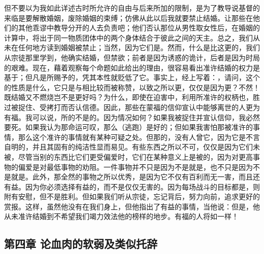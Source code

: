 但不要以为我如此详述古时所允许的自由与后来所加的限制，是为了教导说基督的来临是要解散婚姻，废除婚姻的束缚；仿佛从此以后我就要禁止结婚。让那些在他们的其他乖谬中教导分开的人去负责吧；他们否认那位从男性取女性后，在婚姻的计算中，将出于同一物质团体中的两个身体结合于彼此之间的天主。总之，我们从未在任何地方读到婚姻被禁止；当然，因为它们是。然而，什么是比这更的，我们从宗徒那里学到，他确实结婚，但禁欲；前者是因为诱惑的诡计，后者是因为时局的艰难。现在，藉着观察每个命题如此给出的理由，很容易看出准许结婚的权力是基于；但凡是所赐予的，凭其本性就贬低了它。事实上，经上写着：，请问，这个的性质是什么，它只是与相比较而被称赞，以致之所以更，仅仅是因为更？不然！既结婚又不燃烧岂不是更好吗？为什么，即使在迫害中，利用所准许的权柄也，胜过被捉住、受拷打而否认信德。因此，那些在蒙福的信仰宣认中能够离世的人更为有福。我可以说，所的不是的。因为情况如何？如果我被捉住并宣认信仰，我必然要死。如果我认为那命运可叹，那么（逃跑）是好的；但如果我害怕那被准许的事情，那么这个准许的事情就有某种可疑之处。但那的，没有人曾它，因为它是不言自明的，并且其固有的纯洁性显而易见。有些东西之所以不可，仅仅是因为它们未被，尽管当别的东西比它们更受偏爱时，它们在某种意义上是被的，因为对更高事物的偏爱是对最低事物的劝阻。一件事物并不只是因为不是就是，也不只是因为不是就是。此外，那全然的事物之所以优秀，是因为它不仅有百利而无一害，而且还有益。因为你必须选择有益的，而不是仅仅无害的。因为每场战斗的目标都是，则附有安慰，但不是胜利。但如果我们听从宗徒，忘记背后，努力向前，追求更好的赏报。这样，虽然他没有在我们身上，但他指出了有益的事情，当他说：但是，他从未准许结婚到不希望我们竭力效法他的榜样的地步。有福的人将如一样！\par


\subsection{第四章 论血肉的软弱及类似托辞}

